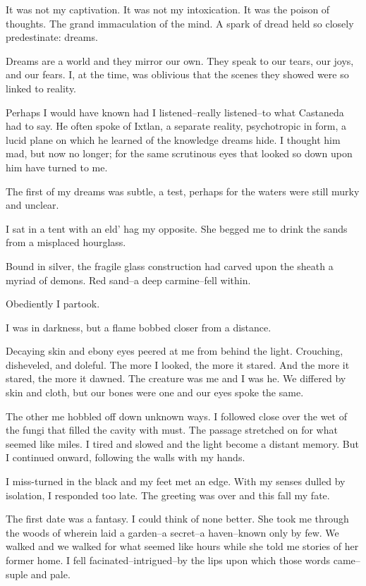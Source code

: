 \documentclass{article}
\begin{document}
It was not my captivation.
It was not my intoxication.
It was the poison of thoughts.
The grand immaculation of the mind.
A spark of dread held so closely predestinate: dreams.
\VV


\noindent
Dreams are a world and they mirror our own.
They speak to our tears, our joys, and our fears.
I, at the time, was oblivious that the scenes they
showed were so linked to reality.


Perhaps I would have known had I listened--really listened--to
what Castaneda had to say.
He often spoke of Ixtlan,
a separate reality,
psychotropic in form,
a lucid plane on which he learned of the knowledge dreams hide.
I thought him mad, but now no longer;
for the same scrutinous eyes that looked so down upon him
have turned to me.
\VV


\noindent
The first of my dreams was subtle, a test, perhaps
for the waters were still murky and unclear.
\VV


\noindent
I sat in a tent with an eld' hag my opposite.
She begged me to drink the sands from a misplaced hourglass.


Bound in silver, the fragile glass construction had
carved upon the sheath a myriad of demons.
Red sand--a deep carmine--fell within.


Obediently I partook.


\noindent
I was in darkness, but a flame bobbed closer from a distance.


Decaying skin and ebony eyes peered at me from behind the light.
Crouching, disheveled, and doleful.
The more I looked, the more it stared.
And the more it stared, the more it dawned.
The creature was me and I was he.
We differed by skin and cloth, but our bones were one
and our eyes spoke the same.


The other me hobbled off down unknown ways.
I followed close over the wet of the fungi that
filled the cavity with must.
The passage stretched on for what seemed like miles.
I tired and slowed and the light become a distant memory.
But I continued onward, following the walls with my hands.


I miss-turned in the black and my feet met an edge.
With my senses dulled by isolation, I responded too late.
The greeting was over and this fall my fate.
\VV


\noindent %
The first date was a fantasy.
I could think of none better. %
She took me through the woods of wherein
laid a garden--a secret--a haven--known only by few. %
We walked and we walked for what seemed like hours
while she told me stories of her former home.
I fell facinated--intrigued--by the lips %
upon which those words came--suple and pale. %
\end{document}
